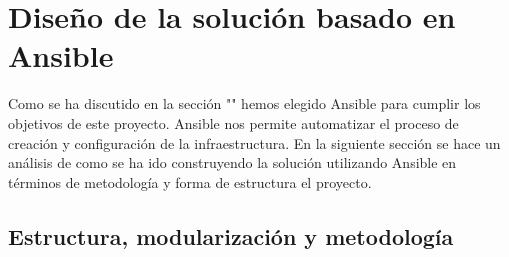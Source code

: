 \section{Diseño de la solución basado en Ansible}
\begin{text}
	Como se ha discutido en la sección "" hemos elegido Ansible para cumplir los objetivos de este proyecto. Ansible nos permite automatizar el proceso de creación y configuración de la infraestructura. En la siguiente sección se hace un análisis de como se ha ido construyendo la solución utilizando Ansible en términos de metodología y forma de estructura el proyecto.
\end{text}

\subsection{Estructura, modularización y metodología}
